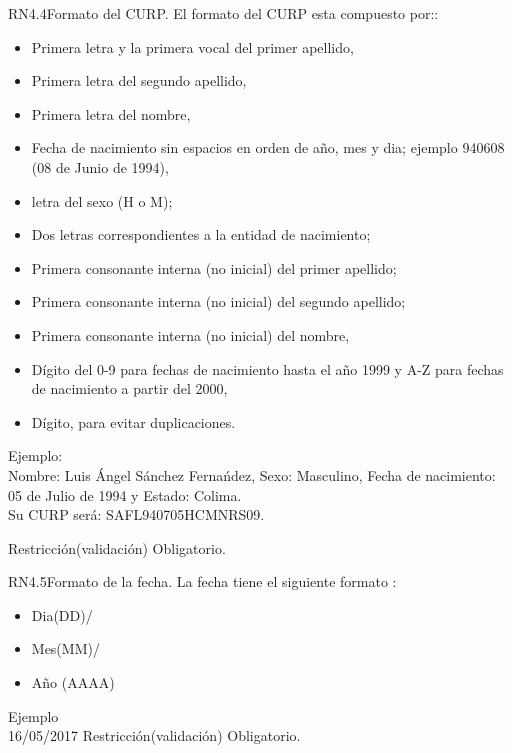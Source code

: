 
\begin{BussinesRule}{RN4.4}{Formato del CURP.}
	\BRitem[Descripción:] El formato del CURP esta compuesto por::
		\begin{itemize}
			\item Primera letra y la primera vocal del primer apellido,
			\item Primera letra del segundo apellido,
			\item Primera letra del nombre,
			\item Fecha de nacimiento sin espacios en orden de año, mes y dia; ejemplo 940608 (08 de Junio de 1994),
			\item letra del sexo (H o M);
			\item Dos letras correspondientes a la entidad de nacimiento;
			\item Primera consonante interna (no inicial) del primer apellido;
			\item Primera consonante interna (no inicial) del segundo apellido;
			\item Primera consonante interna (no inicial) del nombre,
			\item Dígito del 0-9 para fechas de nacimiento hasta el año 1999 y A-Z para fechas de nacimiento a partir del 2000,
			\item Dígito, para evitar duplicaciones.			
		\end{itemize}

Ejemplo:\\
	Nombre: Luis Ángel Sánchez Fernańdez, Sexo: Masculino, Fecha de nacimiento: 05 de Julio de 1994 y Estado: Colima.\\
	Su CURP será: SAFL940705HCMNRS09.

	\BRitem[Tipo:] Restricción(validación)
	\BRitem[Nivel:] Obligatorio.
\end{BussinesRule}


\begin{BussinesRule}{RN4.5}{Formato de la fecha.}
	\BRitem[Descripción:] La fecha tiene el siguiente formato :
		\begin{itemize} 
			\item Dia(DD)/ 
			\item Mes(MM)/
			\item Año (AAAA)
		\end{itemize}
Ejemplo \\
	16/05/2017
	\BRitem[Tipo:] Restricción(validación)
	\BRitem[Nivel:] Obligatorio.
\end{BussinesRule}

